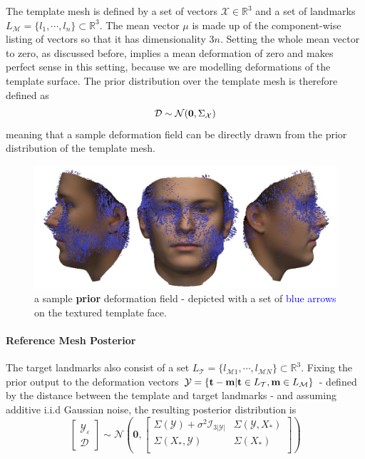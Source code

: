 The template mesh is defined by a set of vectors $\mathcal{X} \in \mathbb{R}^3$ and a set of landmarks $L_\mathcal{M}=\{l_{1}, \cdots, l_{n}\} \subset \mathbb{R}^3$.
The mean vector $\mu$ is made up of the component-wise listing of vectors so that it has dimensionality $3n$. Setting the whole mean vector to zero, as discussed before, implies a mean deformation of zero and makes perfect sense in this setting, because we are modelling deformations of the template surface. 
The prior distribution over the template mesh is therefore defined as 
\begin{equation}
    \mathcal{D} \sim \mathcal{N}(\textbf{0}, \Sigma_{\mathcal{X}})
\end{equation}
meaning that a sample deformation field can be directly drawn from the prior distribution of the template mesh.
\begin{figure}[h!]
    \includegraphics[width=\textwidth]{./resources/img/prior_deformations.pdf}
    \caption{a sample \textbf{prior} deformation field - depicted with a set of \textcolor{blue}{blue arrows} on the textured template face.}
\label{fig:priordeformations}
\end{figure}
\paragraph{Reference Mesh Posterior}
The target landmarks also consist of a set $L_{\mathcal{T}} = \{l_{\mathcal{M}1},\cdots, l_{\mathcal{M}N}\} \subset \mathbb{R}^3$. 
Fixing the prior output to the deformation vectors $\mathcal{Y}=\{\textbf{t}-\textbf{m}\vert \textbf{t} \in L_{\mathcal{T}}, \textbf{m} \in L_{\mathcal{M}}\}$ - defined by the distance between the template and target landmarks - and assuming additive i.i.d Gaussian noise, the resulting posterior distribution is
\begin{equation}
    \begin{bmatrix}\mathcal{Y_{\varepsilon}}\\\mathcal{D}\end{bmatrix}
\sim \mathcal{N}\left(\textbf{0},
\begin{bmatrix}
    \Sigma(\mathcal{Y}) + \sigma^2\mathcal{I}_{3\left|\mathcal{Y} \right|} & \Sigma(\mathcal{Y},X_{*})\\
    \Sigma(X_{*},\mathcal{Y}) & \Sigma(X_{*})\\
\end{bmatrix}
\right)
\end{equation}

